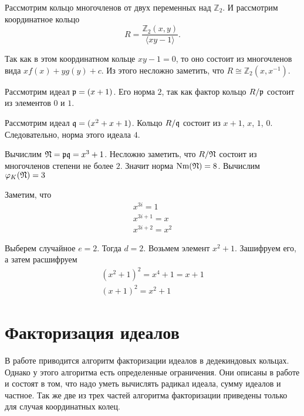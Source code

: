 \documentclass[_00_dissertation.tex]{subfiles}
\begin{document}
\begin{example}
	Рассмотрим кольцо многочленов от двух переменных над $\mathbb{Z}_2$. И рассмотрим координатное кольцо
	\begin{equation*}
		R = \frac{\mathbb{Z}_2(x, y)}{\langle xy - 1\rangle}.
	\end{equation*}
	
	Так как в этом координатном кольце $xy - 1 = 0$, то оно состоит из многочленов вида $xf(x) + yg(y) + c$.
	Из этого несложно заметить, что $R \cong \mathbb{Z}_2(x, x^{-1})$.
	
	Рассмотрим идеал $\mathfrak{p} = (x + 1)$.
	Его норма $2$, так как фактор кольцо $R/\mathfrak{p}$ состоит из элементов $0$ и $1$.
	
	Рассмотрим идеал $\mathfrak{q} = (x^2 + x + 1)$.
	Кольцо $R/\mathfrak{q}$ состоит из $x+1$, $x$, $1$, $0$.
	Следовательно, норма этого идеала $4$.

	Вычислим $\mathfrak{N} = \mathfrak{p}\mathfrak{q} = x^3 + 1$.
	Несложно заметить, что $R/\mathfrak{N}$ состоит из многочленов степени не более $2$.
	Значит норма $\textrm{Nm}(\mathfrak{N}) = 8$.
	Вычислим $\varphi_K(\mathfrak{N}) = 3$

	Заметим, что
	\begin{equation*}
		\begin{array}{l}
			x^{3i} = 1\\
			x^{3i+1} = x\\
			x^{3i+2} = x^2
		\end{array}
	\end{equation*}

	Выберем случайное $e = 2$.
	Тогда $d = 2$.
	Возьмем элемент $x^2 + 1$.
	Зашифруем его, а затем расшифруем
	\begin{equation*}
	    \begin{split}
    		(x^2 + 1)^2 = x^4 + 1 = x + 1\\
	        (x + 1)^2 = x^2 + 1
	    \end{split}
	\end{equation*}
\end{example}

\section{Факторизация идеалов}

В работе \cite{source:Darkey-Mensah} приводится алгоритм факторизации идеалов в дедекиндовых кольцах.
Однако у этого алгоритма есть определенные ограничения.
Они описаны в работе \cite{source:Darkey-Mensah} и состоят в том, что надо уметь вычислять радикал идеала, сумму идеалов и частное.
Так же две из трех частей алгоритма факторизации приведены только для случая координатных колец.
\end{document}
